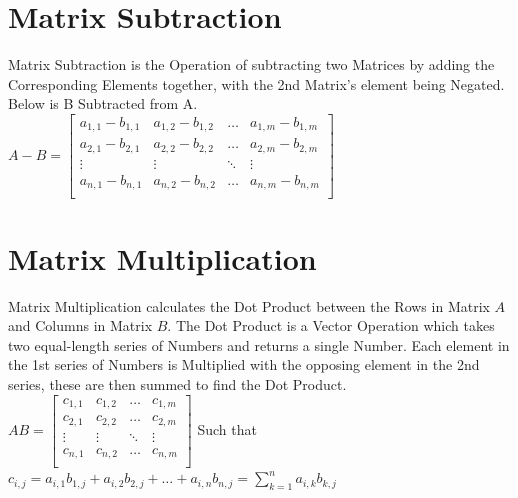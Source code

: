 \begin{flushleft}
                \chapter{Matrix Subtraction}
                    \vspace{0.2cm}
                    Matrix Subtraction is the Operation of subtracting two Matrices by adding the Corresponding Elements together, with the 2nd Matrix's element 
                    being Negated. Below is B Subtracted from A. \\
                    $
                    A - B =
                    \begin{bmatrix}
                        a_{1,1} - b_{1,1} & a_{1,2} - b_{1,2} & \hdots  & a_{1,m} - b_{1,m} \\
                        a_{2,1} - b_{2,1} & a_{2,2} - b_{2,2} & \hdots  & a_{2,m} - b_{2,m} \\
                        \vdots            & \vdots            & \ddots  & \vdots            \\
                        a_{n,1} - b_{n,1} & a_{n,2} - b_{n,2} & \hdots  & a_{n,m} - b_{n,m} \\
                    \end{bmatrix}
                    $
                \chapter{Matrix Multiplication}
                    \vspace{0.2cm}
                    Matrix Multiplication calculates the Dot Product between the Rows in Matrix $A$ and Columns in Matrix $B$. The Dot Product is a Vector Operation
                    which takes two equal-length series of Numbers and returns a single Number. Each element in the 1st series of Numbers is Multiplied with the opposing element
                    in the 2nd series, these are then summed to find the Dot Product. \\
                    $
                    AB = 
                    \begin{bmatrix}
                        c_{1,1} & c_{1,2} & \hdots  & c_{1,m} \\
                        c_{2,1} & c_{2,2} & \hdots  & c_{2,m} \\
                        \vdots  & \vdots  & \ddots  & \vdots  \\
                        c_{n,1} & c_{n,2} & \hdots  & c_{n,m} \\
                    \end{bmatrix}
                    $
                    Such that $c_{i,j} = a_{i,1}b_{1,j} + a_{i,2}b_{2,j} + \hdots + a_{i,n}b_{n,j} = \sum^{n}_{k=1}a_{i,k}b_{k,j}$

\end{flushleft}
